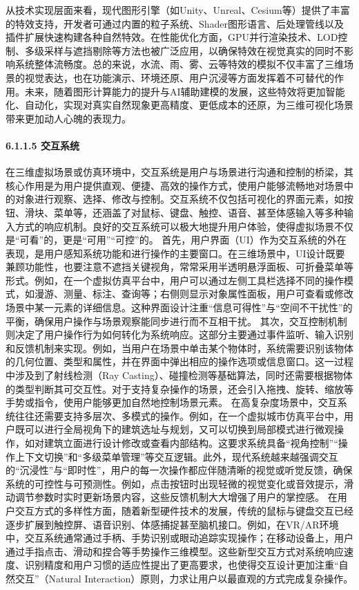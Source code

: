 从技术实现层面来看，现代图形引擎（如Unity、Unreal、Cesium等）提供了丰富的特效支持，开发者可通过内置的粒子系统、Shader图形语言、后处理管线以及插件扩展快速构建各种自然特效。在性能优化方面，GPU并行渲染技术、LOD控制、多级采样与遮挡剔除等方法也被广泛应用，以确保特效在视觉真实的同时不影响系统整体流畅度。总的来说，水流、雨、雾、云等特效的模拟不仅丰富了三维场景的视觉表达，也在功能演示、环境还原、用户沉浸等方面发挥着不可替代的作用。未来，随着图形计算能力的提升与AI辅助建模的发展，这些特效将更加智能化、自动化，实现对真实自然现象更高精度、更低成本的还原，为三维可视化场景带来更加动人心魄的表现力。 \paragraph{6.1.1.5 交互系统}\label{ux4ea4ux4e92ux7cfbux7edf} 在三维虚拟场景或仿真环境中，交互系统是用户与场景进行沟通和控制的桥梁，其核心作用是为用户提供直观、便捷、高效的操作方式，使用户能够流畅地对场景中的对象进行观察、选择、修改与控制。交互系统不仅包括可视化的界面元素，如按钮、滑块、菜单等，还涵盖了对鼠标、键盘、触控、语音、甚至体感输入等多种输入方式的响应机制。良好的交互系统可以极大地提升用户体验，使得虚拟场景不仅是``可看''的，更是``可用''``可控''的。 首先，用户界面（UI）作为交互系统的外在表现，是用户感知系统功能和进行操作的主要窗口。在三维场景中，UI设计既要兼顾功能性，也要注意不遮挡关键视角，常常采用半透明悬浮面板、可折叠菜单等形式。例如，在一个虚拟仿真平台中，用户可以通过左侧工具栏选择不同的操作模式，如漫游、测量、标注、查询等；右侧则显示对象属性面板，用户可查看或修改场景中某一元素的详细信息。这种界面设计注重``信息可得性''与``空间不干扰性''的平衡，确保用户操作与场景观察能同步进行而不互相干扰。 其次，交互控制机制则决定了用户操作行为如何转化为系统响应。这部分主要通过事件监听、输入识别和反馈机制来实现。例如，当用户在场景中单击某个物体时，系统需要识别该物体的几何位置、类型和属性，并在界面中弹出相应的操作选项或信息窗口。这一过程中涉及到了射线检测（Ray Casting）、碰撞检测等基础算法，同时还需要根据物体的类型判断其可交互性。对于支持复杂操作的场景，还会引入拖拽、旋转、缩放等手势或指令，使用户能够更加自然地控制场景元素。 在高复杂度场景中，交互系统往往还需要支持多层次、多模式的操作。例如，在一个虚拟城市仿真平台中，用户既可以进行全局视角下的建筑选址与规划，又可以切换到局部模式进行微观操作，如对建筑立面进行设计修改或查看内部结构。这要求系统具备``视角控制''``操作上下文切换''和``多级菜单管理''等交互逻辑。此外，现代系统越来越强调交互的``沉浸性''与``即时性''，用户的每一次操作都应伴随清晰的视觉或听觉反馈，确保系统的可控性与可预测性。例如，点击按钮时出现轻微的视觉变化或音效提示，滑动调节参数时实时更新场景内容，这些反馈机制大大增强了用户的掌控感。 在用户交互方式的多样性方面，随着新型硬件技术的发展，传统的鼠标与键盘交互已经逐步扩展到触控屏、语音识别、体感捕捉甚至脑机接口。例如，在VR/AR环境中，交互系统通常通过手柄、手势识别或眼动追踪实现操作；在移动设备上，用户通过手指点击、滑动和捏合等手势操作三维模型。这些新型交互方式对系统响应速度、识别精度和用户习惯的适应性提出了更高要求，也使得交互设计更加注重``自然交互''（Natural Interaction）原则，力求让用户以最直观的方式完成复杂操作。 
